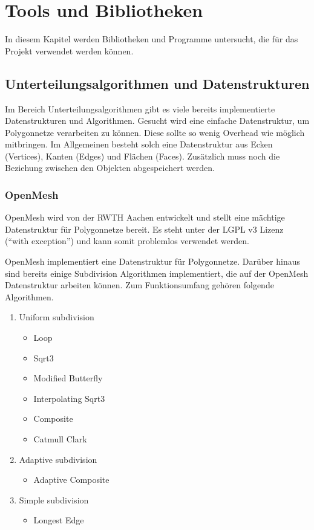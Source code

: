 \chapter{Tools und Bibliotheken}

In diesem Kapitel werden Bibliotheken und Programme untersucht, die für das Projekt verwendet werden können. 
 
\section{Unterteilungsalgorithmen und Datenstrukturen}

Im Bereich Unterteilungsalgorithmen gibt es viele bereits implementierte Datenstrukturen und Algorithmen.
Gesucht wird eine einfache Datenstruktur, um Polygonnetze verarbeiten zu können.
Diese sollte so wenig Overhead wie möglich mitbringen.
Im Allgemeinen besteht solch eine Datenstruktur aus Ecken (Vertices), Kanten (Edges) und Flächen (Faces).
Zusätzlich muss noch die Beziehung zwischen den Objekten abgespeichert werden.

\subsection{OpenMesh}

OpenMesh wird von der \acs{RWTH} Aachen entwickelt und stellt eine mächtige Datenstruktur für Polygonnetze bereit.
Es steht unter der \acs{LGPL} v3 Lizenz (\enquote{with exception}) und kann somit problemlos verwendet werden.

OpenMesh implementiert eine Datenstruktur für Polygonnetze.
Darüber hinaus sind bereits einige Subdivision Algorithmen implementiert, die auf der OpenMesh Datenstruktur arbeiten können.
Zum Funktionsumfang gehören folgende Algorithmen.
\begin{enumerate}
\item Uniform subdivision
\begin{itemize}
	\item Loop
	\item Sqrt3
	\item Modified Butterfly
	\item Interpolating Sqrt3
	\item Composite
	\item Catmull Clark
\end{itemize}
\item Adaptive subdivision
\begin{itemize}
	\item Adaptive Composite
\end{itemize}
\item Simple subdivision
\begin{itemize}
	\item Longest Edge
\end{itemize}
\end{enumerate}

